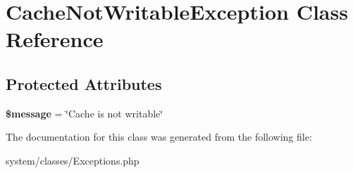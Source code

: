 \hypertarget{class_cache_not_writable_exception}{
\section{CacheNotWritableException Class Reference}
\label{class_cache_not_writable_exception}
}
\subsection*{Protected Attributes}
\begin{DoxyCompactItemize}
\item 
\hypertarget{class_cache_not_writable_exception_abf17cb2dba2ed17cb28aa5f37deb5293}{
{\bfseries \$message} = \char`\"{}Cache is not writable\char`\"{}}
\label{class_cache_not_writable_exception_abf17cb2dba2ed17cb28aa5f37deb5293}

\end{DoxyCompactItemize}


The documentation for this class was generated from the following file:\begin{DoxyCompactItemize}
\item 
system/classes/Exceptions.php\end{DoxyCompactItemize}
